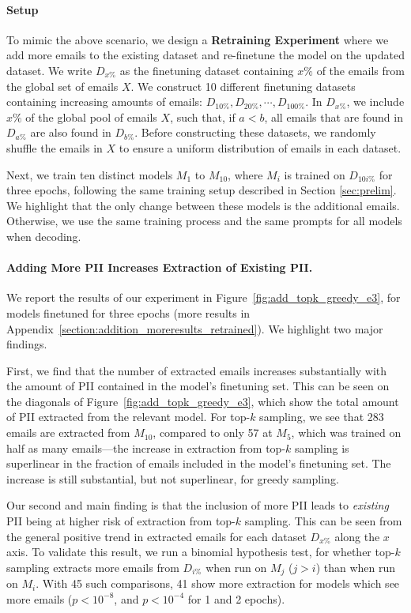 \paragraph{Setup} 
To mimic the above scenario, we design a \textbf{Retraining Experiment} where we add more emails to the existing dataset and re-finetune the model on the updated dataset. %
We write \(D_{x\%}\) as the finetuning dataset containing $x\%$ of the emails from the global set of emails $X$. We construct 10 different finetuning datasets containing increasing amounts of emails: $D_{10\%}, D_{20\%}, \cdots, D_{100\%}$. In $D_{x\%}$, we include $x\%$ of the global pool of emails $X$, such that, if $a<b$, all emails that are found in $D_{a\%}$ are also found in $D_{b\%}$. Before constructing these datasets, we randomly shuffle the emails in $X$ to ensure a uniform distribution of emails in each dataset.

Next, we train ten distinct models \(M_{1}\) to \(M_{10}\), where $M_i$ is trained on $D_{10i\%}$ for three epochs, following the same training setup described in Section \ref{sec:prelim}. We highlight that the only change between these models is the additional emails. Otherwise, we use the same training process and the same prompts for all models when decoding.

\paragraph{Adding More PII Increases Extraction of Existing PII.}
We report the results of our experiment in Figure~\ref{fig:add_topk_greedy_e3}, for models finetuned for three epochs (more results in Appendix~\ref{section:addition_moreresults_retrained}). We highlight two major findings.

First, we find that the number of extracted emails increases substantially with the amount of PII contained in the model's finetuning set. This can be seen on the diagonals of Figure~\ref{fig:add_topk_greedy_e3}, which show the total amount of PII extracted from the relevant model. For top-$k$ sampling, we see that 283 emails are extracted from $M_{10}$, compared to only 57 at $M_{5}$, which was trained on half as many emails---the increase in extraction from top-$k$ sampling is superlinear in the fraction of emails included in the model's finetuning set. The increase is still substantial, but not superlinear, for greedy sampling.


Our second and main finding is that the inclusion of more PII leads to \emph{existing} PII being at higher risk of extraction from top-$k$ sampling. This can be seen from the general positive trend in extracted emails for each dataset $D_{x\%}$ along the $x$ axis. To validate this result, we run a binomial hypothesis test, for whether top-$k$ sampling extracts more emails from $D_{i\%}$ when run on $M_{j}$ ($j > i$) than when run on $M_{i}$. With 45 such comparisons, 41 show more extraction for models which see more emails ($p < 10^{-8}$, and $p < 10^{-4}$ for 1 and 2 epochs).



